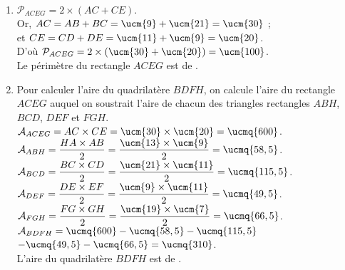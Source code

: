\begin{colonne*exercice}
\begin{corrige}
   \ \\ [-5mm]
   \begin{enumerate}
      \item $\mathcal{P}_{ACEG} =2\times(AC+CE)$. \\
         Or, $AC =AB+BC =\ucm{9}+\ucm{21} =\ucm{30}$ ;\\
         et $CE =CD+DE =\ucm{11}+\ucm{9} =\ucm{20}$. \\
         D'où $\mathcal{P}_{ACEG} =2\times(\ucm{30}+\ucm{20}) =\ucm{100}$. \\
         {\blue Le périmètre du rectangle $ACEG$ est de }.
      \item Pour calculer l'aire du quadrilatère $BDFH$, on calcule l'aire du rectangle $ACEG$ auquel on soustrait l'aire de chacun des triangles rectangles $ABH$, $BCD$, $DEF$ et $FGH$. \\
      $\mathcal{A}_{ACEG} =AC\times CE =\ucm{30}\times\ucm{20} =\ucmq{600}$. \\ [1.5mm]
      $\mathcal{A}_{ABH} =\dfrac{HA\times AB}{2} =\dfrac{\ucm{13}\times\ucm{9}}{2} =\ucmq{58,5}$. \\ [1.5mm]
      $\mathcal{A}_{BCD} =\dfrac{BC\times CD}{2} =\dfrac{\ucm{21}\times\ucm{11}}{2} =\ucmq{115,5}$. \\ [1.5mm]
      $\mathcal{A}_{DEF} =\dfrac{DE\times EF}{2} =\dfrac{\ucm{9}\times\ucm{11}}{2} =\ucmq{49,5}$. \\ [1mm]
      $\mathcal{A}_{FGH} = \dfrac{FG\times GH}{2} =\dfrac{\ucm{19}\times\ucm{7}}{2} =\ucmq{66,5}$. \\ [1.5mm]
      $\mathcal{A}_{BDFH} =\ucmq{600}-\ucmq{58,5}-\ucmq{115,5}$ \\
      \hspace*{14mm} $-\ucmq{49,5}-\ucmq{66,5} =\ucmq{310}$. \\
      {\blue L'aire du quadrilatère $BDFH$ est de }.
   \end{enumerate}
\end{corrige}

\end{colonne*exercice}


\Recreation


